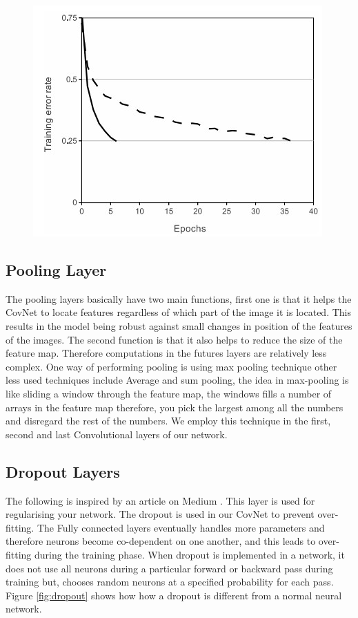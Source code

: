 \documentclass[12pt, a4paper,oneside]{report}
\begin{document}
\begin{figure}
	\includegraphics [scale=0.9] {relu}
	\label{fig:relu}
\end{figure}


\subsection{Pooling Layer}
The pooling layers basically have two main functions, first one is that it helps the CovNet to locate features regardless of which part of the image it is located. This results in the model being robust against small changes in position of the features of the images. The second function is that it also helps to reduce the size of the feature map. Therefore computations in the futures layers are relatively less complex. One way of performing pooling is using max pooling technique other less used techniques include Average and sum pooling, the idea in max-pooling is like sliding a window through the feature map, the windows fills a number of arrays in the feature map therefore, you pick the largest among all the numbers and disregard the rest of the numbers. We employ this technique in the first, second and last Convolutional layers of our network.

\subsection{Dropout Layers}
The following is inspired by an article on Medium \cite{dropout}. 
This layer is used for regularising your network. The dropout is used in our CovNet to prevent over-fitting. The Fully connected layers eventually handles more parameters and therefore neurons become co-dependent on one another, and this leads to over-fitting during the training phase. When dropout is implemented in a network, it does not use all neurons during a particular forward or backward pass during training but, chooses random neurons at a specified probability for each pass. Figure \ref{fig:dropout} shows how how a dropout is different from a normal neural network.
\end{document}
